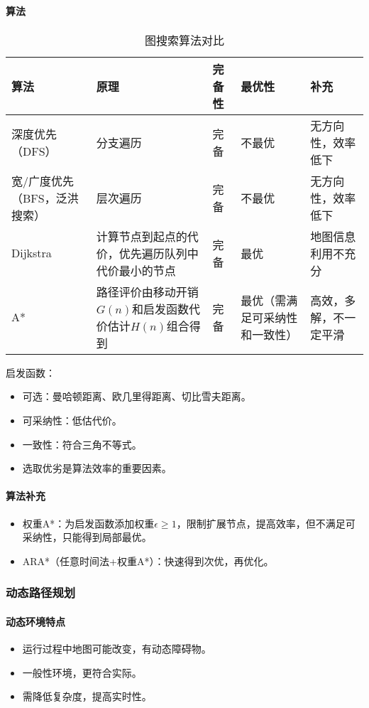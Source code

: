 \documentclass[
12pt, %
a4paper, 
oneside, %
headinclude,footinclude, %
]{scrartcl}
\begin{document}
\paragraph{算法}
\begin{table}[H]
\centering
\begin{tabular}{|p{2cm}|p{6cm}|p{1.4cm}|p{3.5cm}|p{2cm}|}
\hline
算法 & 原理 & 完备性 & 最优性 & 补充 \\
\hline
深度优先（DFS） & 分支遍历 & 完备 & 不最优 & 无方向性，效率低下 \\
\hline
宽/广度优先（BFS，泛洪搜索） & 层次遍历 & 完备 & 不最优 & 无方向性，效率低下 \\
\hline
Dijkstra & 计算节点到起点的代价，优先遍历队列中代价最小的节点 & 完备 & 最优 & 地图信息利用不充分 \\
\hline
A* & 路径评价由移动开销$ G(n) $和启发函数代价估计$ H(n) $组合得到 & 完备 & 最优（需满足可采纳性和一致性） & 高效，多解，不一定平滑 \\
\hline
\end{tabular}
\caption{图搜索算法对比}
\end{table}

启发函数：
\begin{itemize}
\item 可选：曼哈顿距离、欧几里得距离、切比雪夫距离。
\item 可采纳性：低估代价。
\item 一致性：符合三角不等式。
\item 选取优劣是算法效率的重要因素。
\end{itemize}
\paragraph{算法补充}
\begin{itemize}
\item 权重A*：为启发函数添加权重$ \epsilon \geq 1 $，限制扩展节点，提高效率，但不满足可采纳性，只能得到局部最优。
\item ARA*（任意时间法+权重A*）：快速得到次优，再优化。
\end{itemize}
\subsubsection[动态路径规划]{动态路径规划}
\paragraph{动态环境特点}
\begin{itemize}
\item 运行过程中地图可能改变，有动态障碍物。
\item 一般性环境，更符合实际。
\item 需降低复杂度，提高实时性。
\end{itemize}
\end{document}
